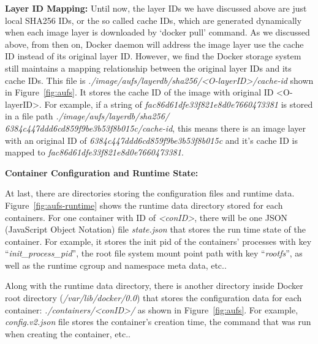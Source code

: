 \textbf{Layer ID Mapping:}  
Until now, the layer IDs we have discussed above are just local SHA256 IDs, or the so called cache IDs, which are generated dynamically when each image layer is downloaded by `docker pull' command. As we discussed above, from then on, Docker daemon will address the image layer use the cache ID instead of its original layer ID.
However, we find the Docker storage system still maintains a mapping relationship between the original layer IDs and its cache IDs. This file is \textit{./image/aufs/layerdb/sha256/<O-layerID>/cache-id} shown in Figure~\ref{fig:aufs}.
It stores the cache ID of the image with original ID <O-layerID>. For example, if a string of \textit{
fac86d61dfe33f821e8d0e7660473381} is stored in a file path \textit{./image/aufs/layerdb/sha256/
6384c447ddd6cd859f9be3b53f8b015c/cache-id}, this means there is an image layer with an original ID of \textit{
6384c447ddd6cd859f9be3b53f8b015c} and it's cache ID is mapped to \textit{
fac86d61dfe33f821e8d0e7660473381}.



\textbf{Container Configuration and Runtime State:}

At last, there are directories storing the configuration files and runtime data. Figure~\ref{fig:aufs-runtime} shows the runtime data directory stored for each containers. For one container with ID of \textit{<conID>}, there will be one JSON (JavaScript Object Notation)  file \textit{state.json} that stores the run time state of the container. For example, it stores the init pid of the containers' processes with key ``\textit{init\_process\_pid}'', the root file system mount point path with key ``\textit{rootfs}'', as well as the runtime cgroup and namespace meta data, etc.. 

Along with the runtime data directory, there is another directory inside Docker root directory (\textit{/var/lib/docker/0.0}) that stores the configuration data for each container: \textit{./containers/<conID>/} as shown in Figure~\ref{fig:aufs}. For example, \textit{ config.v2.json} file stores the container's creation time, the command that was run when creating the container, etc..



